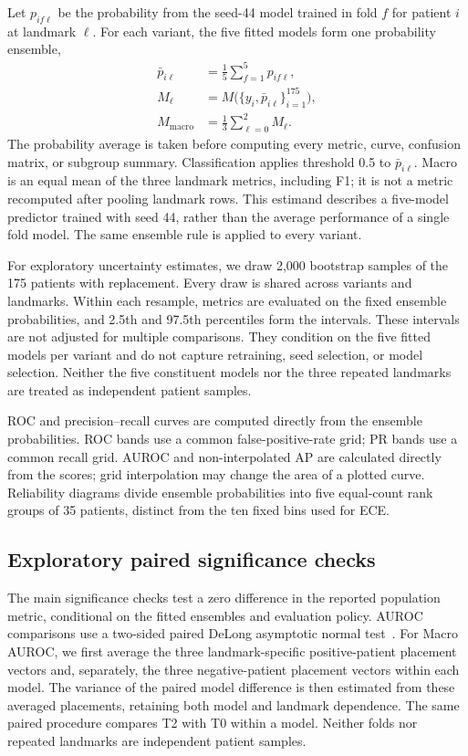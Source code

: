 Let $p_{if\ell}$ be the probability from the seed-44 model trained in fold $f$ for patient $i$ at landmark $\ell$. For each variant, the five fitted models form one probability ensemble,
\begin{equation}
\begin{aligned}
 \bar p_{i\ell}&=\frac{1}{5}\sum_{f=1}^{5}p_{if\ell},\\
 M_{\ell}&=M\bigl(\{y_i,\bar p_{i\ell}\}_{i=1}^{175}\bigr),\\
 M_{\mathrm{macro}}&=\frac{1}{3}\sum_{\ell=0}^{2}M_{\ell}.
\end{aligned}
\end{equation}
The probability average is taken before computing every metric, curve, confusion matrix, or subgroup summary. Classification applies threshold 0.5 to $\bar p_{i\ell}$. Macro is an equal mean of the three landmark metrics, including F1; it is not a metric recomputed after pooling landmark rows. This estimand describes a five-model predictor trained with seed 44, rather than the average performance of a single fold model. The same ensemble rule is applied to every variant.

For exploratory uncertainty estimates, we draw 2,000 bootstrap samples of the 175 patients with replacement. Every draw is shared across variants and landmarks. Within each resample, metrics are evaluated on the fixed ensemble probabilities, and 2.5th and 97.5th percentiles form the intervals. These intervals are not adjusted for multiple comparisons. They condition on the five fitted models per variant and do not capture retraining, seed selection, or model selection. Neither the five constituent models nor the three repeated landmarks are treated as independent patient samples.

ROC and precision--recall curves are computed directly from the ensemble probabilities. ROC bands use a common false-positive-rate grid; PR bands use a common recall grid. AUROC and non-interpolated AP are calculated directly from the scores; grid interpolation may change the area of a plotted curve. Reliability diagrams divide ensemble probabilities into five equal-count rank groups of 35 patients, distinct from the ten fixed bins used for ECE.

\subsection{Exploratory paired significance checks}
The main significance checks test a zero difference in the reported population metric, conditional on the fitted ensembles and evaluation policy. AUROC comparisons use a two-sided paired DeLong asymptotic normal test~\citep{delong1988}. For Macro AUROC, we first average the three landmark-specific positive-patient placement vectors and, separately, the three negative-patient placement vectors within each model. The variance of the paired model difference is then estimated from these averaged placements, retaining both model and landmark dependence. The same paired procedure compares T2 with T0 within a model. Neither folds nor repeated landmarks are independent patient samples.

